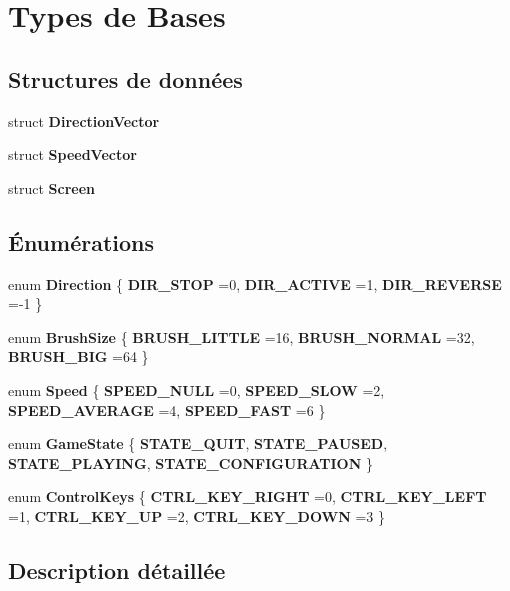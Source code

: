 \section{Types de Bases}
\label{group___bases___types}
\subsection*{Structures de données}
\begin{DoxyCompactItemize}
\item 
struct \textbf{ Direction\+Vector}
\item 
struct \textbf{ Speed\+Vector}
\item 
struct \textbf{ Screen}
\end{DoxyCompactItemize}
\subsection*{Énumérations}
\begin{DoxyCompactItemize}
\item 
enum \textbf{ Direction} \{ \textbf{ D\+I\+R\+\_\+\+S\+T\+OP} =0, 
\textbf{ D\+I\+R\+\_\+\+A\+C\+T\+I\+VE} =1, 
\textbf{ D\+I\+R\+\_\+\+R\+E\+V\+E\+R\+SE} =-\/1
 \}
\item 
enum \textbf{ Brush\+Size} \{ \textbf{ B\+R\+U\+S\+H\+\_\+\+L\+I\+T\+T\+LE} =16, 
\textbf{ B\+R\+U\+S\+H\+\_\+\+N\+O\+R\+M\+AL} =32, 
\textbf{ B\+R\+U\+S\+H\+\_\+\+B\+IG} =64
 \}
\item 
enum \textbf{ Speed} \{ \textbf{ S\+P\+E\+E\+D\+\_\+\+N\+U\+LL} =0, 
\textbf{ S\+P\+E\+E\+D\+\_\+\+S\+L\+OW} =2, 
\textbf{ S\+P\+E\+E\+D\+\_\+\+A\+V\+E\+R\+A\+GE} =4, 
\textbf{ S\+P\+E\+E\+D\+\_\+\+F\+A\+ST} =6
 \}
\item 
enum \textbf{ Game\+State} \{ \textbf{ S\+T\+A\+T\+E\+\_\+\+Q\+U\+IT}, 
\textbf{ S\+T\+A\+T\+E\+\_\+\+P\+A\+U\+S\+ED}, 
\textbf{ S\+T\+A\+T\+E\+\_\+\+P\+L\+A\+Y\+I\+NG}, 
\textbf{ S\+T\+A\+T\+E\+\_\+\+C\+O\+N\+F\+I\+G\+U\+R\+A\+T\+I\+ON}
 \}
\item 
enum \textbf{ Control\+Keys} \{ \textbf{ C\+T\+R\+L\+\_\+\+K\+E\+Y\+\_\+\+R\+I\+G\+HT} =0, 
\textbf{ C\+T\+R\+L\+\_\+\+K\+E\+Y\+\_\+\+L\+E\+FT} =1, 
\textbf{ C\+T\+R\+L\+\_\+\+K\+E\+Y\+\_\+\+UP} =2, 
\textbf{ C\+T\+R\+L\+\_\+\+K\+E\+Y\+\_\+\+D\+O\+WN} =3
 \}
\end{DoxyCompactItemize}


\subsection{Description détaillée}


